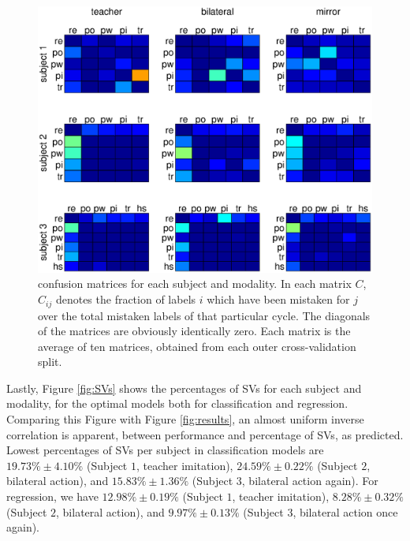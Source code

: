 \begin{figure}[!ht] \centering
  \includegraphics[width=\textwidth]{figs/figConf}
  \caption{confusion matrices for each subject and modality.
    In each matrix $C$, $C_{ij}$ denotes the fraction of labels
    $i$ which have been mistaken for $j$ over the total mistaken
    labels of that particular cycle. The diagonals of the matrices
    are obviously identically zero. Each matrix is the average of
    ten matrices, obtained from each outer cross-validation split.}
  \label{fig:confusion}
\end{figure}

Lastly, Figure \ref{fig:SVs} shows the percentages of SVs for each
subject and modality, for the optimal models both for classification
and regression. Comparing this Figure with Figure \ref{fig:results},
an almost uniform inverse correlation is apparent,
between performance and percentage of SVs, as predicted.
Lowest percentages of SVs per subject in classification models are
$19.73\% \pm 4.10\%$ (Subject $1$, teacher imitation),
$24.59\% \pm 0.22\%$ (Subject $2$, bilateral action), and
$15.83\% \pm 1.36\%$ (Subject $3$, bilateral action again).
For regression, we have
$12.98\% \pm 0.19\%$ (Subject $1$, teacher imitation),
$8.28\% \pm 0.32\%$ (Subject $2$, bilateral action), and
$9.97\% \pm 0.13\%$ (Subject $3$, bilateral action once again).

